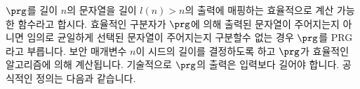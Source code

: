 

$\prg$를 길이 $n$의 문자열을 길이 $l(n) > n$의 출력에 매핑하는 효율적으로 계산 가능한 함수라고 합시다. 효율적인 구분자가 $\prg$에 의해 출력된 문자열이 주어지는지 아니면 임의로 균일하게 선택된 문자열이 주어지는지 구분할수 없는 경우 $\prg$를 PRG라고 부릅니다. 보안 매개변수 $n$이 시드의 길이를 결정하도록 하고 $\prg$가 효율적인 알고리즘에 의해 계산됩니다. 기술적으로 $\prg$의 출력은 입력보다 길어야 합니다. 공식적인 정의는 다음과 같습니다.

